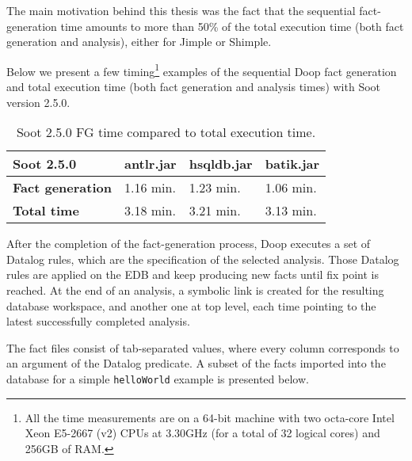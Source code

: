 \documentclass{dithesis}
\begin{document}
        The main motivation behind this thesis was the fact that the sequential fact-generation time amounts to more than 50\% of the total execution time (both fact generation and analysis), either for Jimple or Shimple.


        Below we present a few timing\footnote{All the time measurements are on a 64-bit machine with two octa-core Intel Xeon E5-2667 (v2) CPUs at 3.30GHz (for a total of 32 logical cores) and 256GB of RAM.} examples of the sequential Doop fact generation and total execution time (both fact generation and analysis times) with Soot version 2.5.0.

        \begin{table}[H]
            \centering
                \begin{tabular}{llll}
                \hline
                \textbf{Soot 2.5.0}      & \textbf{antlr.jar} & \textbf{hsqldb.jar} & \textbf{batik.jar} \\ \hline
                \textbf{Fact generation} & 1.16 min.          & 1.23 min.           & 1.06 min.          \\
                \textbf{Total time}      & 3.18 min.          & 3.21 min.           & 3.13 min.          \\ \hline
                \end{tabular}
                \newline
            \caption[Soot 2.5.0 FG times]{Soot 2.5.0 FG time compared to total execution time.}
        \end{table}

    	After the completion of the fact-generation process, Doop executes a set of Datalog rules, which are the specification of the selected analysis. Those Datalog rules are applied on the EDB and keep producing new facts until fix point is reached. At the end of an analysis, a symbolic link is created for the resulting database workspace, and another one at top level, each time pointing to the latest successfully completed analysis.

        The fact files consist of tab-separated values, where every column corresponds to an argument of the Datalog predicate. 
        A subset of the facts imported into the database for a simple \texttt{helloWorld} example is presented below. \\
        
\end{document}
